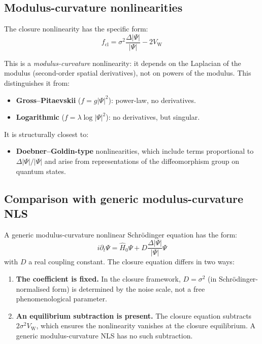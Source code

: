 \documentclass[12pt]{article}
\newcommand{\VW}{V_{\mathrm{W}}}
\begin{document}
\subsection{Modulus-curvature nonlinearities}

The closure nonlinearity has the specific form:
\begin{equation}
    f_{\mathrm{cl}} = \sigma^2\frac{\Delta|\Psi|}{|\Psi|} - 2\VW
\end{equation}

This is a \textit{modulus-curvature} nonlinearity: it depends on the Laplacian of the modulus (second-order spatial derivatives), not on powers of the modulus. This distinguishes it from:
\begin{itemize}
    \item \textbf{Gross--Pitaevskii} ($f = g|\Psi|^2$): power-law, no derivatives.
    \item \textbf{Logarithmic} ($f = \lambda\log|\Psi|^2$): no derivatives, but singular.
\end{itemize}

It is structurally closest to:
\begin{itemize}
    \item \textbf{Doebner--Goldin-type} nonlinearities, which include terms proportional to $\Delta|\Psi|/|\Psi|$ and arise from representations of the diffeomorphism group on quantum states.
\end{itemize}

\subsection{Comparison with generic modulus-curvature NLS}

A generic modulus-curvature nonlinear Schr\"odinger equation has the form:
\begin{equation}
    i\partial_t\Psi = \hat{H}_0\Psi + D\frac{\Delta|\Psi|}{|\Psi|}\Psi
\end{equation}
with $D$ a real coupling constant. The closure equation differs in two ways:

\begin{enumerate}
    \item \textbf{The coefficient is fixed.} In the closure framework, $D = \sigma^2$ (in Schr\"odinger-normalised form) is determined by the noise scale, not a free phenomenological parameter.

    \item \textbf{An equilibrium subtraction is present.} The closure equation subtracts $2\sigma^2\VW$, which ensures the nonlinearity vanishes at the closure equilibrium. A generic modulus-curvature NLS has no such subtraction.
\end{enumerate}
\end{document}

